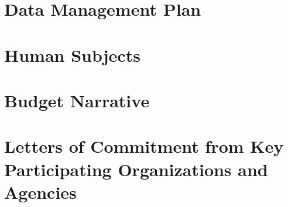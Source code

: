\documentclass[12pt,letterpaper]{article}
\begin{document}
\renewcommand{\thepage}{}
\begin{appendices}
\section*{Data Management Plan}

\section*{Human Subjects}

\section*{Budget Narrative}
\label{budget}

\section*{Letters of Commitment from Key Participating Organizations and Agencies}

\end{appendices}

\pagebreak
\printbibliography
\end{document}
